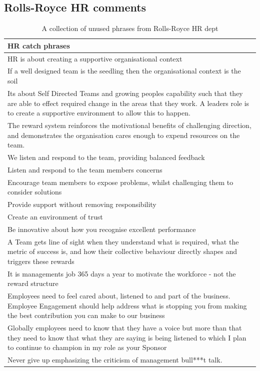 \documentclass[12pt,a4paper]{article}
\begin{document}
\begin{appendix}
\section{Rolls-Royce HR comments}
\begin{table}[H]
\label{tab:win}
\caption{A collection of unused phrases from Rolls-Royce HR dept}
	\begin{center}
	\begin{tabular}{p{}}
\toprule 
{\bf HR catch phrases}\\
\midrule
HR is about creating a supportive organisational context\\
If a well designed team is the seedling then the organisational context is the soil\\
Its about Self Directed Teams and growing peoples capability such that they are able to effect required change in the areas that they work.
A leaders role is to create a supportive environment to allow this to happen.\\
The reward system reinforces the motivational benefits of challenging direction, and demonstrates the organisation cares enough to expend resources on the team.\\
We listen and respond to the team, providing balanced feedback\\
Listen and respond to the team members concerns\\
Encourage team members to expose problems, whilst challenging them to consider solutions\\
Provide support without removing responsibility\\
Create an environment of trust\\
Be innovative about how you recognise excellent performance\\
A Team gets line of sight when they understand what is required, what the metric of success is, and how their collective behaviour directly shapes and triggers these rewards\\
It is managements job 365 days a year to motivate the workforce - not the reward structure\\
Employees need to feel cared about, listened to and part of the business. Employee Engagement should help address what is stopping you from making the best contribution you can make to our business\\
Globally employees need to know that they have a voice but more than that they need to know that what they are saying is being listened to which I plan to continue to champion in my role as your Sponsor\\
Never give up emphasizing the criticism of management bull***t talk.\\
\bottomrule
	\end{tabular}
\end{center}
\end{table}

\newpage
{}

\end{appendix}
\end{document}
